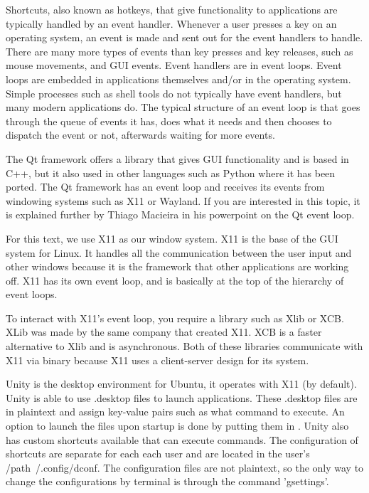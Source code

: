\documentclass[12pt]{article}
\begin{document}
	
Shortcuts, also known as hotkeys, that give functionality to applications are typically handled by an event handler.
Whenever a user presses a key on an operating system, an event is made and sent out for the event handlers to handle.
There are many more types of events than key presses and key releases, such as mouse movements, and GUI events.
Event handlers are in event loops. Event loops are embedded in applications themselves and/or in the operating system. Simple processes such as shell tools do not typically have event handlers, but many modern applications do. The typical structure of an event loop is that goes through the queue of events it has, does what it needs and then chooses to dispatch the event or not, afterwards waiting for more events. 

The Qt framework offers a library that gives GUI functionality and is based in C++, but it also used in other languages such as Python where it has been ported.
The Qt framework has an event loop and receives its events from windowing systems such as X11 or Wayland.
If you are interested in this topic, it is explained further by Thiago Macieira in his powerpoint on the Qt event loop\cite{QtSlides}.

For this text, we use X11 as our window system.
X11 is the base of the GUI system for Linux.
It handles all the communication between the user input and other windows because it is the framework that other applications are working off.
X11 has its own event loop, and is basically at the top of the hierarchy of event loops.

To interact with X11's event loop, you require a library such as Xlib or XCB.
XLib was made by the same company that created X11.
XCB is a faster alternative to Xlib and is asynchronous.
Both of these libraries communicate with X11 via binary because X11 uses a client-server design for its system.

Unity is the desktop environment for Ubuntu, it operates with X11 (by default). Unity is able to use .desktop files to launch applications.
These .desktop files are in plaintext and assign key-value pairs such as what command to execute.
An option to launch the files upon startup is done by putting them in .
Unity also has custom shortcuts available that can execute commands.
The configuration of shortcuts are separate for each each user and are located in the user's /path{~/.config/dconf}.
The configuration files are not plaintext, so the only way to change the configurations by terminal is through the command 'gsettings'.
\end{document}
